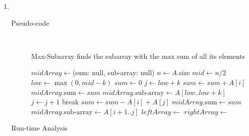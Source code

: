 \documentclass[paper=a4, fontsize=11pt]{scrartcl} %
\numberwithin{equation}{section} %
\numberwithin{figure}{section} %
\numberwithin{table}{section} %
\begin{document}
\begin{enumerate}[label=\bfseries Algorithm \arabic*:]
    \item \hfill \\
    \begin{description}
        \item[Pseudo-code] \hfill \\
        \begin{algorithmc}
            \caption{Max-Subarray finds the subarray with the max sum of all its elements}
                \State $midArray \gets $(sum: null, sub-array: null)
                \State $n \gets A$.size
                  \State {}
                \EndIf
                \State $mid \gets n / 2$
                \State $low \gets \max{(0, mid - k)}$
                \State $sum \gets 0$
                \State $j \gets low + k$
                        \State $sum \gets sum + A[i]$
                    \EndFor
                    \State $midArray. \textrm{sum} \gets sum$
                    \State $midArray. \textrm{sub-array} \gets A[low..low + k]$
                \EndIf
                    \State $j \gets j + 1$
                        \State break
                    \EndIf
                    \State $sum \gets sum - A[i] + A[j]$
                        \State $midArray. \textrm{sum} \gets sum$
                        \State $midArray. \textrm{sub-array} \gets A[i + 1..j]$
                    \EndIf
                \EndFor
                \State $leftArray \gets$ 
                \State $rightArray \gets$ 
                \State {}
            \EndFunction
        \end{algorithmc}
        \item[Run-time Analysis] \hfill \\
    \end{description}


\end{enumerate}
\end{document}

